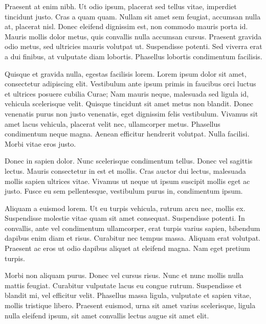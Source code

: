 Praesent at enim nibh. Ut odio ipsum, placerat sed tellus vitae, imperdiet tincidunt justo. Cras a quam quam. Nullam sit amet sem feugiat, accumsan nulla at, placerat nisl. Donec eleifend dignissim est, non commodo mauris porta id. Mauris mollis dolor metus, quis convallis nulla accumsan cursus. Praesent gravida odio metus, sed ultricies mauris volutpat ut. Suspendisse potenti. Sed viverra erat a dui finibus, at vulputate diam lobortis. Phasellus lobortis condimentum facilisis.

Quisque et gravida nulla, egestas facilisis lorem. Lorem ipsum dolor sit amet, consectetur adipiscing elit. Vestibulum ante ipsum primis in faucibus orci luctus et ultrices posuere cubilia Curae; Nam mauris neque, malesuada sed ligula id, vehicula scelerisque velit. Quisque tincidunt sit amet metus non blandit. Donec venenatis purus non justo venenatis, eget dignissim felis vestibulum. Vivamus sit amet lacus vehicula, placerat velit nec, ullamcorper metus. Phasellus condimentum neque magna. Aenean efficitur hendrerit volutpat. Nulla facilisi. Morbi vitae eros justo.

Donec in sapien dolor. Nunc scelerisque condimentum tellus. Donec vel sagittis lectus. Mauris consectetur in est et mollis. Cras auctor dui lectus, malesuada mollis sapien ultrices vitae. Vivamus ut neque ut ipsum suscipit mollis eget ac justo. Fusce eu sem pellentesque, vestibulum purus in, condimentum ipsum.

Aliquam a euismod lorem. Ut eu turpis vehicula, rutrum arcu nec, mollis ex. Suspendisse molestie vitae quam sit amet consequat. Suspendisse potenti. In convallis, ante vel condimentum ullamcorper, erat turpis varius sapien, bibendum dapibus enim diam et risus. Curabitur nec tempus massa. Aliquam erat volutpat. Praesent ac eros ut odio dapibus aliquet at eleifend magna. Nam eget pretium turpis.

Morbi non aliquam purus. Donec vel cursus risus. Nunc et nunc mollis nulla mattis feugiat. Curabitur vulputate lacus eu congue rutrum. Suspendisse et blandit mi, vel efficitur velit. Phasellus massa ligula, vulputate et sapien vitae, mollis tristique libero. Praesent euismod, urna sit amet varius scelerisque, ligula nulla eleifend ipsum, sit amet convallis lectus augue sit amet elit.



